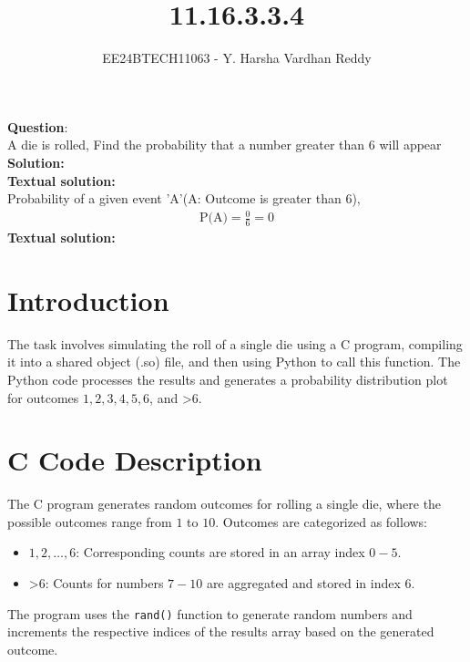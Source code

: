 \documentclass[journal]{IEEEtran}
\begin{document}
	
	
	\vspace{3cm}
	
	\title{11.16.3.3.4}
	\author{EE24BTECH11063 - Y. Harsha Vardhan Reddy }
	{\let\newpage\relax\maketitle}
	
	\renewcommand{\thefigure}{\theenumi}
	\renewcommand{\thetable}{\theenumi}
	\setlength{\intextsep}{10pt} %
	
	
	\renewcommand{\thetable}{\theenumi}
	
	
\textbf{Question}:\\
A die is rolled, Find the probability that a number greater than 6 will appear \\
\textbf{Solution: }\\
\textbf{Textual solution: }\\
Probability of a given event 'A'(A: Outcome is greater than 6),\\
\begin{align}
    \text{P(A)}=\frac{0}{6}=0
\end{align}
\textbf{Textual solution: }\\

\section*{Introduction}
The task involves simulating the roll of a single die using a C program, compiling it into a shared object (.so) file, and then using Python to call this function. The Python code processes the results and generates a probability distribution plot for outcomes \(1, 2, 3, 4, 5, 6\), and \textgreater6.

\section*{C Code Description}
The C program generates random outcomes for rolling a single die, where the possible outcomes range from \(1\) to \(10\). Outcomes are categorized as follows:
\begin{itemize}
    \item \(1, 2, \ldots, 6\): Corresponding counts are stored in an array index \(0-5\).
    \item \textgreater6: Counts for numbers \(7-10\) are aggregated and stored in index \(6\).
\end{itemize}
The program uses the \texttt{rand()} function to generate random numbers and increments the respective indices of the results array based on the generated outcome.
\end{document}
